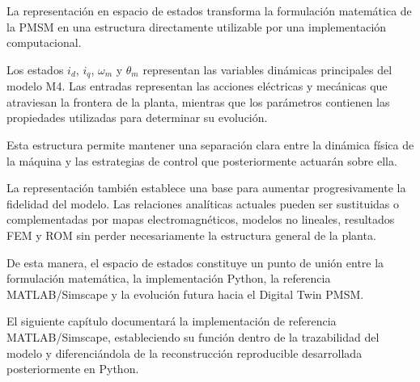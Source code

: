 La representación en espacio de estados transforma la formulación matemática de la PMSM en una estructura directamente utilizable por una implementación computacional.

Los estados $i_d$, $i_q$, $\omega_m$ y $\theta_m$ representan las variables dinámicas principales del modelo M4. Las entradas representan las acciones eléctricas y mecánicas que atraviesan la frontera de la planta, mientras que los parámetros contienen las propiedades utilizadas para determinar su evolución.

Esta estructura permite mantener una separación clara entre la dinámica física de la máquina y las estrategias de control que posteriormente actuarán sobre ella.

La representación también establece una base para aumentar progresivamente la fidelidad del modelo. Las relaciones analíticas actuales pueden ser sustituidas o complementadas por mapas electromagnéticos, modelos no lineales, resultados FEM y ROM sin perder necesariamente la estructura general de la planta.

De esta manera, el espacio de estados constituye un punto de unión entre la formulación matemática, la implementación Python, la referencia MATLAB/Simscape y la evolución futura hacia el Digital Twin PMSM.

El siguiente capítulo documentará la implementación de referencia MATLAB/Simscape, estableciendo su función dentro de la trazabilidad del modelo y diferenciándola de la reconstrucción reproducible desarrollada posteriormente en Python.
